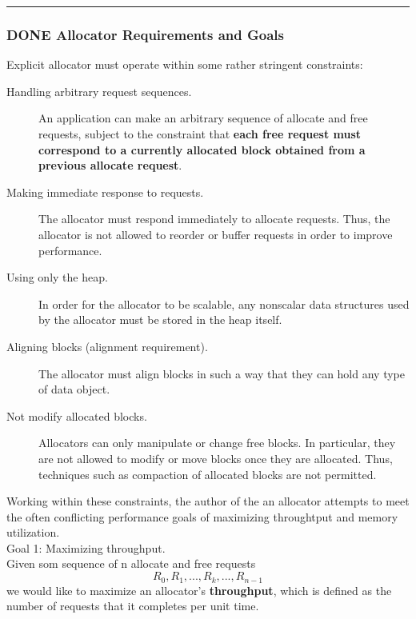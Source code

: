 \documentclass[11pt]{article}
\begin{document}
\noindent\rule{\textwidth}{0.5pt}


\subsubsection{{\bfseries\sffamily DONE} Allocator Requirements and Goals}
\label{sec:org0cde99f}
Explicit allocator must operate within some rather stringent constraints:\\
\begin{description}
\item[{Handling arbitrary request sequences.}] An application can make an arbitrary sequence of allocate and free requests, subject to the constraint that \textbf{each free request must correspond to a currently allocated block obtained from a previous allocate request}.\\
\item[{Making immediate response to requests.}] The allocator must respond immediately to allocate requests. Thus, the allocator is not allowed to reorder or buffer requests in order to improve performance.\\
\item[{Using only the heap.}] In order for the allocator to be scalable, any nonscalar data structures used by the allocator must be stored in the heap itself.\\
\item[{Aligning blocks (alignment requirement).}] The allocator must align blocks in such a way that they can hold any type of data object.\\
\item[{Not modify allocated blocks.}] Allocators can only manipulate or change free blocks. In particular, they are not allowed to modify or move blocks once they are allocated. Thus, techniques such as compaction of allocated blocks are not permitted.\\
\end{description}

Working within these constraints, the author of the an allocator attempts to meet the often conflicting performance goals of maximizing throughtput and memory utilization.\\

Goal 1: Maximizing throughput.\\
Given som sequence of n allocate and free requests\\
\begin{equation}
R_0, R_1, ..., R_k, ..., R_{n-1}
\end{equation}
we would like to maximize an allocator's \textbf{throughput}, which is defined as the number of requests that it completes per unit time.\\
\end{document}
